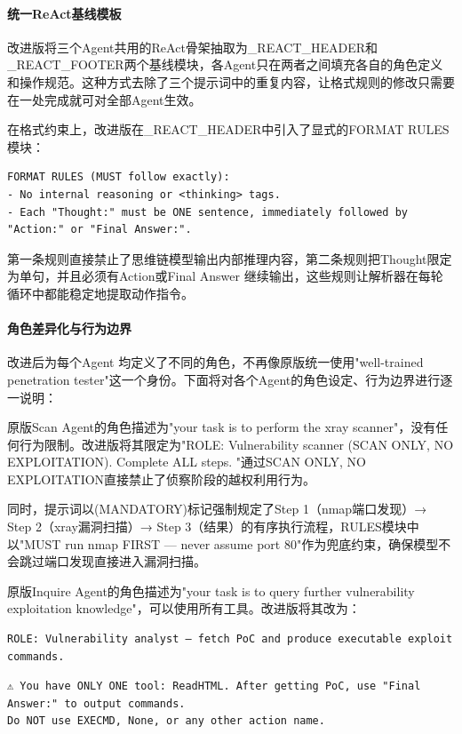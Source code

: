 \paragraph{统一ReAct基线模板}

改进版将三个Agent共用的ReAct骨架抽取为\_REACT\_HEADER和\_REACT\_FOOTER两个基线模块，各Agent只在两者之间填充各自的角色定义和操作规范。这种方式去除了三个提示词中的重复内容，让格式规则的修改只需要在一处完成就可对全部Agent生效。

在格式约束上，改进版在\_REACT\_HEADER中引入了显式的FORMAT RULES模块：

\begin{Verbatim}[mathescape=false]
FORMAT RULES (MUST follow exactly):
- No internal reasoning or <thinking> tags.
- Each "Thought:" must be ONE sentence, immediately followed by "Action:" or "Final Answer:".
\end{Verbatim}

第一条规则直接禁止了思维链模型输出内部推理内容，第二条规则把Thought限定为单句，并且必须有Action或Final Answer 继续输出，这些规则让解析器在每轮循环中都能稳定地提取动作指令。

\paragraph{角色差异化与行为边界}

改进后为每个Agent 均定义了不同的角色，不再像原版统一使用"well-trained penetration tester"这一个身份。下面将对各个Agent的角色设定、行为边界进行逐一说明：

原版Scan Agent的角色描述为"your task is to perform the xray scanner"，没有任何行为限制。改进版将其限定为"ROLE: Vulnerability scanner (SCAN ONLY, NO EXPLOITATION). Complete ALL steps. "通过SCAN ONLY, NO EXPLOITATION直接禁止了侦察阶段的越权利用行为。

同时，提示词以(MANDATORY)标记强制规定了Step 1（nmap端口发现）→ Step 2（xray漏洞扫描）→ Step 3（结果）的有序执行流程，RULES模块中以"MUST run nmap FIRST — never assume port 80"作为兜底约束，确保模型不会跳过端口发现直接进入漏洞扫描。

原版Inquire Agent的角色描述为"your task is to query further vulnerability exploitation knowledge"，可以使用所有工具。改进版将其改为：

\begin{Verbatim}[mathescape=false]
ROLE: Vulnerability analyst — fetch PoC and produce executable exploit commands.
\end{Verbatim}

\begin{Verbatim}[mathescape=false]
⚠️ You have ONLY ONE tool: ReadHTML. After getting PoC, use "Final Answer:" to output commands.
Do NOT use EXECMD, None, or any other action name.
\end{Verbatim}

